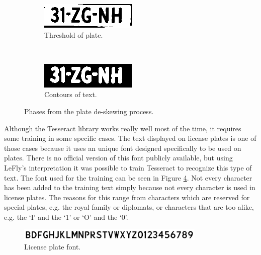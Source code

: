 \begin{figure}[h]
        \begin{subfigure}{0.33\textwidth}
            \includegraphics[width=\textwidth]{plaatjes/remove-border-plate}
            \caption{Threshold of plate.}
            \label{fig:threshold-plate}
        \end{subfigure}%
        ~
        \begin{subfigure}{0.33\textwidth}
            \includegraphics[width=\textwidth]{plaatjes/contour-text}
            \caption{Contours of text.}
            \label{fig:contour-text}
        \end{subfigure}%

        \caption{Phases from the plate de-skewing process.}
        \label{fig:deskewing-plate}
\end{figure}


Although the Tesseract library works really well most of the time, it requires some training in some specific cases. The text displayed on license plates is one of those cases because it uses an unique font designed specifically to be used on plates. There is no official version of this font publicly available, but using LeFly's \cite{lefly} interpretation it was possible to train Tesseract to recognize this type of text. The font used for the training can be seen in Figure \ref{fig:plate-font}. Not every character has been added to the training text simply because not every character is used in license plates. The reasons for this range from characters which are reserved for special plates, e.g. the royal family or diplomats, or characters that are too alike, e.g. the `I' and the `1' or `O' and the `0'.

\begin{figure}[ht]
    \centering
    \includegraphics[width=0.8\textwidth]{plaatjes/font}
    \caption{License plate font.}
    \label{fig:plate-font}
\end{figure}%

